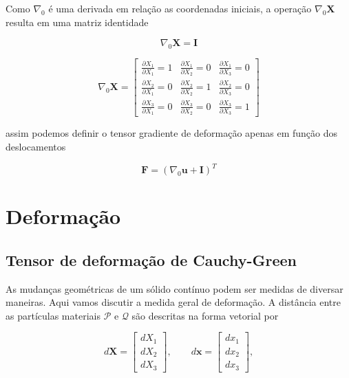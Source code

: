 Como $\nabla_0$ é uma derivada em relação as coordenadas iniciais, a operação $\nabla_0 \mathbf{X}$ resulta em uma matriz identidade

\begin{equation}
	\nabla_0 \mathbf{X} = \mathbf{I}
\end{equation}

\begin{equation}
	\nabla_0 \mathbf{X} = 
	\left[\begin{array}{ccc}
		\frac{\partial X_1}{\partial X_1}  = 1
		& \frac{\partial X_1}{\partial X_2} = 0
		& \frac{\partial X_1}{\partial X_3} = 0
		\\
		\frac{\partial X_2}{\partial X_1}  = 0
		& \frac{\partial X_2}{\partial X_2} = 1
		& \frac{\partial X_2}{\partial X_3} = 0
		\\
		\frac{\partial X_3}{\partial X_1} = 0
		& \frac{\partial X_3}{\partial X_2} = 0
		& \frac{\partial X_3}{\partial X_3} = 1
	\end{array}\right]
\end{equation}

assim podemos definir o tensor gradiente de deformação apenas em função dos deslocamentos

\begin{equation}
	\mathbf{F} = (\nabla_0 \mathbf{u} + \mathbf{I})^T
\end{equation}

\section{Deformação}
\subsection{Tensor de deformação de Cauchy-Green}
As mudanças geométricas de um sólido contínuo podem ser medidas de diversar maneiras. Aqui vamos discutir a medida geral de deformação. A distância entre as partículas materiais $\mathcal{P}$ e $\mathcal{Q}$ são descritas na forma vetorial por

\begin{equation}
	d \mathbf{X} = 
	\left[\begin{array}{ccc}
		dX_1 \\ dX_2 \\ dX_3
	\end{array}\right],
	\qquad
	d \mathbf{x} = 
	\left[\begin{array}{ccc}
		dx_1 \\ dx_2 \\ dx_3
	\end{array}\right],
\end{equation}

